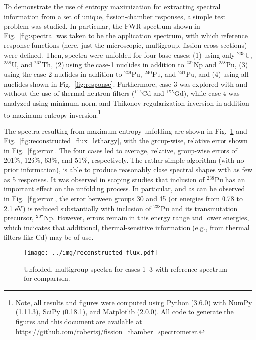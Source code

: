 \documentclass[journal]{IEEEtran}
\newcommand{\FIG}[1]{Fig.~\ref{#1}}               %
\begin{document}
To demonstrate the use of entropy maximization for extracting spectral information from a set of unique, fission-chamber responses,  a simple test problem was studied.  In particular, the PWR spectrum shown in \FIG{fig:spectra} was taken to be the application spectrum, with which reference response functions (here, just the microscopic, multigroup, fission cross sections) were defined.  Then, spectra were unfolded for four base cases: (1) using only ${}^{235}$U, ${}^{238}$U, and ${}^{232}$Th, (2) using the case-1 nuclides in addition to ${}^{237}$Np and ${}^{238}$Pu, (3) using the case-2 nuclides in addition to ${}^{239}$Pu, ${}^{240}$Pu, and ${}^{241}$Pu, and (4) using all nuclides shown in \FIG{fig:response}.  Furthermore, case 3 was explored with and without the use of thermal-neutron filters (${}^{113}$Cd and ${}^{155}$Gd), while  case 4 was analyzed using minimum-norm and Thikonov-regularization inversion in addition to maximum-entropy inversion.\footnote{Note, all results and figures were computed using Python (3.6.0) with NumPy (1.11.3), SciPy (0.18.1), and Matplotlib (2.0.0).  All code to generate the figures and this document are available at \url{https://github.com/robertsj/fission_chamber_spectrometer}.}


The spectra resulting from maximum-entropy unfolding are shown in \FIG{fig:reconstructed_flux} and \FIG{fig:reconstructed_flux_lethargy}, with the group-wise, relative error shown in \FIG{fig:error}. The four cases led to average, relative, group-wise errors of 201\%, 126\%, 63\%, and 51\%, respectively.   The rather simple algorithm (with no prior information), is able to produce reasonably close spectral shapes with as few as 5 responses.  It was observed in scoping studies that inclusion of ${}^{238}$Pu has an important effect on the unfolding process.  In particular, and as can be observed in \FIG{fig:error}, the error between groups 30 and 45 (or energies from 0.78 to 2.1 eV) is reduced substantially with inclusion of ${}^{238}$Pu and its transmutation precursor, ${}^{237}$Np.  However, errors remain in this energy range and lower energies, which indicates that additional, thermal-sensitive information (e.g., from thermal filters like Cd) may be of use.

\begin{figure}[h!tb]
  \centering
  \texttt{[image: ../img/reconstructed\_flux.pdf]}
  \caption{Unfolded, multigroup spectra for cases 1--3 with reference spectrum for comparison.}
  \label{fig:reconstructed_flux}
\end{figure}
\end{document}
